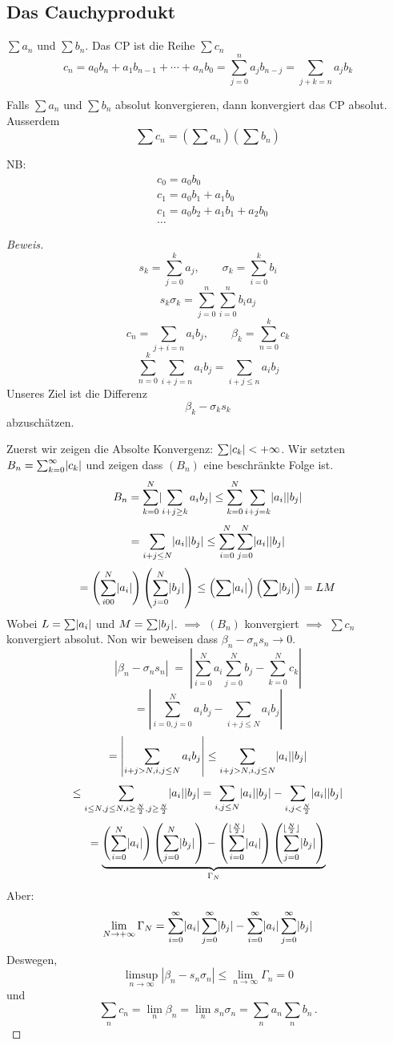 \subsection{Das Cauchyprodukt}
\begin{Def}
  $\sum a_n$ und $\sum b_n$. Das CP ist die Reihe $\sum c_n$
  \[c_n=a_0b_n+a_1b_{n-1}+\cdots+a_nb_0=\sum^n_{j=0}a_jb_{n-j}=\sum_{j+k=n}a_jb_k\]
\end{Def}
\begin{Sat}
  Falls $\sum a_n$ und $\sum b_n$ absolut konvergieren, dann konvergiert das CP absolut.
Ausserdem  \[\sum c_n=\left( \sum a_n \right)\left( \sum b_n \right)\]
\end{Sat}
NB:
\begin{align*}
&c_0=a_0b_0\\
&c_1=a_0b_1+a_1b_0\\
&c_1=a_0b_2+a_1b_1+a_2b_0\\
& \ldots 
\end{align*}

\begin{proof}[Beweis]
  \[s_k=\sum^k_{j=0}a_j,\qquad \sigma_k=\sum_{i=0}^k b_i\]
  \[s_k\sigma_k=\sum^n_{j=0}\sum^n_{i=0}b_ia_j\]
  \[c_n=\sum_{j+i=n}a_ib_j,\qquad \beta_k=\sum^k_{n=0}c_k\]
  \[\sum^k_{n=0}\sum_{i+j=n}a_ib_j=\sum_{i+j\leq n}a_ib_j\]
  Unseres Ziel ist die Differenz  \[\beta_k-\sigma_ks_k\]
abzusch\"atzen.

Zuerst wir zeigen die Absolte Konvergenz: $\sum\mathopen| c_k \mathclose|<+\infty$.
Wir setzten $B_n=\sum^\infty_{k=0}\mathopen| c_k \mathclose|$ und zeigen dass
$\left( B_n \right)$ eine beschränkte Folge ist.
  \[B_n=\sum^N_{k=0}\mathopen| \sum_{i+j\geq k}a_ib_j \mathclose|\leq\sum^N_{k=0}\sum_{i+j=k}\mathopen| a_i \mathclose|\mathopen| b_j \mathclose|\]
  \[=\sum_{i+j\leq N}\mathopen| a_i \mathclose|\mathopen| b_j \mathclose|\leq\sum^N_{i=0}\sum^N_{j=0}\mathopen| a_i \mathclose|\mathopen| b_j \mathclose|\]
  \[=\left( \sum^N_{i00}\mathopen| a_i \mathclose| \right)\left( \sum_{j=0}^N\mathopen| b_j \mathclose| \right)\leq\left( \sum\mathopen| a_i \mathclose| \right)\left( \sum\mathopen| b_j \mathclose| \right) = LM\]
  Wobei $L=\sum\mathopen| a_i \mathclose|$ und $M=\sum\mathopen| b_j \mathclose|$. $\implies$ $\left( B_n \right)$ 
konvergiert $\implies$ $\sum c_n$ konvergiert absolut.
Non wir beweisen dass $\beta_n - \sigma_n s_n \to 0$.  
\[|\beta_n - \sigma_n s_n| \;=\; \left| \sum^N_{i=0}a_i \sum^N_{j=0}b_j-\sum^N_{k=0} c_k
\right|\]
  \[=\left|\sum^N_{i=0, j=0}a_ib_j-\sum_{i+j\leq N}a_ib_j\right|\]
  \[=\left|\sum_{i+j>N, i , j\leq N}a_ib_j\right|\leq
\sum_{i+j>N, i , j\leq N}\mathopen| a_i \mathclose|\mathopen| b_j \mathclose|\]
  \[\leq \sum_{i\leq N, j\leq N, i\geq \frac{N}{2}, j\geq\frac{N}{2}}\mathopen| a_i \mathclose|\mathopen| b_j \mathclose|=\sum_{i,j\leq N}\mathopen| a_i \mathclose|\mathopen| b_j \mathclose|- \sum_{i,j<\frac{N}{2}}\mathopen| a_i \mathclose|\mathopen| b_j \mathclose|\]
  \[=\underbrace{\left( \sum^N_{i=0}\mathopen| a_i \mathclose| \right)\left( \sum^N_{j=0}\mathopen| b_j \mathclose| \right)-\left( \sum_{i=0}^{\lfloor \frac{N}{2} \rfloor}\mathopen| a_i \mathclose| \right)\left( \sum^{\lfloor \frac{N}{2} \rfloor}_{j=0}\mathopen| b_j \mathclose| \right)}_{\Gamma_N}\]
Aber:
  \[\lim_{N\to+\infty}\Gamma_N=\sum^\infty_{i=0}\mathopen| a_i \mathclose|\sum^\infty_{j=0}\mathopen| b_j \mathclose|-\sum^\infty_{i=0}\mathopen| a_i \mathclose|\sum^\infty_{j=0}\mathopen| b_j \mathclose|\]
Deswegen,
\[\limsup_{n\to\infty} |\beta_n - s_n\sigma_n| \leq \lim_{n\to\infty} \Gamma_n 
= 0\]
und
\[ \sum_n c_n = \lim_n \beta_n = \lim_n s_n\sigma_n = \sum_n a_n \sum_n b_n\, .
\]
\end{proof}
